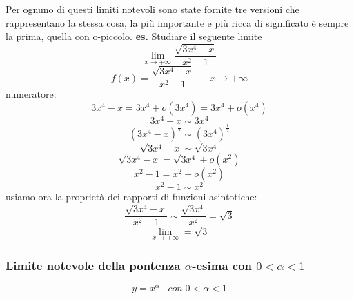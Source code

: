 Per ognuno di questi limiti notevoli sono state fornite tre versioni che rappresentano la stessa cosa, la più importante e più ricca di significato è sempre la prima, quella con o-piccolo.
\newline
\newline
\newline
\textbf{es.} Studiare il seguente limite
\[
    \lim_{x\rightarrow + \infty} \frac{\sqrt{3x^4-x}}{x^2-1}
\]
\[
    f(x) = \frac{\sqrt{3x^4-x}}{x^2-1} \;\;\;\;\;\; x\rightarrow + \infty
\]
numeratore:
\[
    3x^4-x = 3x^4 + o(3x^4) = 3x^4 + o(x^4)
\]
\[
    3x^4-x  \sim  3 x^4
\]
\[
    (3x^4-x)^{\frac{1}{2}}  \sim  (3 x^4)^{\frac{1}{2}}
\]
\[
    \sqrt{3x^4-x} \sim  \sqrt{3 x^4}
\]
\[
    \sqrt{3x^4-x} = \sqrt{3x^4} + o(x^2)
\]
\[
    x^2-1 = x^2 +o(x^2)
\]
\[
    x^2 -1 \sim x^2
\]
usiamo ora la proprietà dei rapporti di funzioni asintotiche:
\[
    \frac{\sqrt{3x^4-x}}{x^2-1} \sim \frac{\sqrt{3x^4}}{x^2} = \sqrt{3}
\]
\[
    \lim_{x\rightarrow+\infty} = \sqrt{3}
\]
\subsubsection*{Limite notevole della pontenza $\alpha$-esima con $0<\alpha<1$}
\[
    y = x^{\alpha} \;\;\; con \;0<\alpha<1
\] 

